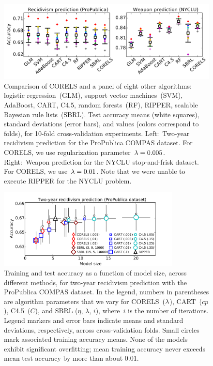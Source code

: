 \begin{figure}[t!]
\begin{center}
\includegraphics[trim={2mm, 10mm, 2mm, 0mm},
width=\textwidth]{figs/compare-compas-weapon.pdf}
\end{center}
\caption{Comparison of CORELS and a panel of eight other algorithms:
logistic regression~(GLM), support vector machines~(SVM),
AdaBoost, CART, C4.5, random forests~(RF), RIPPER,
scalable Bayesian rule lists~(SBRL).
%
Test accuracy means (white squares),
standard deviations (error bars),
and values (colors correspond to folds),
for 10-fold cross-validation experiments.
%
Left:~Two-year recidivism prediction for the ProPublica COMPAS dataset.
%
For CORELS, we use regularization parameter~${{\lambda}=0.005}$.
%
Right:~Weapon prediction for the NYCLU stop-and-frisk dataset.
%
For CORELS, we use~${{\lambda}=0.01}$.
%
Note that we were unable to execute RIPPER for the NYCLU problem.
}
\label{fig:comparison}
\end{figure}
%
\begin{figure}[t!]
\begin{center}
\includegraphics[trim={12mm, 0mm, 24mm, 5mm},
width=0.82\textwidth]{figs/compas-sparsity-training.pdf}

\end{center}
\caption{Training and test accuracy as a function of model size, across different methods,
for two-year recidivism prediction with the ProPublica COMPAS dataset.
%
In the legend, numbers in parentheses are algorithm parameters that we vary
for CORELS~(${\lambda}$), CART~($cp$), C4.5~($C$), and SBRL ($\eta$, $\lambda$, $i$),
where~$i$ is the number of iterations.
%
Legend markers and error bars indicate means and standard deviations,
respectively, across cross-validation folds.
%
Small circles mark associated training accuracy means.
%
None of the models exhibit significant overfitting;
mean training accuracy never exceeds mean test accuracy
by more than about 0.01.
}
\label{fig:sparsity-compas}
\end{figure}

